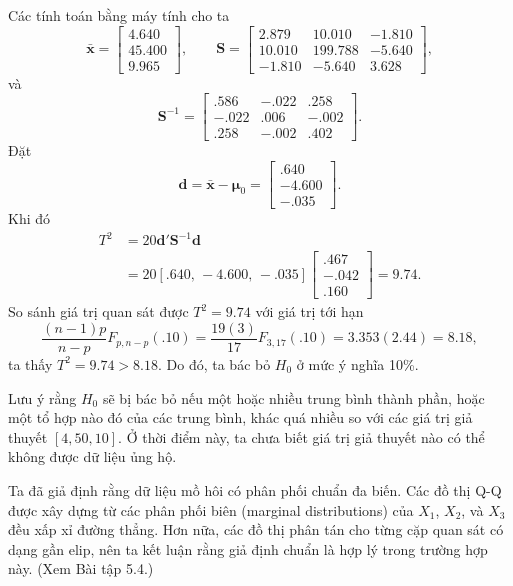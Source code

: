 Các tính toán bằng máy tính cho ta
\[
  \bar{\mathbf{x}} =
  \begin{bmatrix}
    4.640 \\
    45.400 \\
    9.965
  \end{bmatrix},
  \qquad
  \mathbf{S}=
  \begin{bmatrix}
    2.879 & 10.010 & -1.810 \\
    10.010 & 199.788 & -5.640 \\
    -1.810 & -5.640 & 3.628
  \end{bmatrix},
\]
và
\[
  \mathbf{S}^{-1}=
  \begin{bmatrix}
    .586 & -.022 & .258 \\
    -.022 & .006 & -.002 \\
    .258 & -.002 & .402
  \end{bmatrix}.
\]
Đặt
\[
  \mathbf{d}
  = \bar{\mathbf{x}}-\boldsymbol{\mu}_0
  = \begin{bmatrix} .640 \\ -4.600 \\ -.035 \end{bmatrix}.
\]
Khi đó
\[
\begin{aligned}
  T^2
  &= 20\mathbf{d}'\mathbf{S}^{-1}\mathbf{d} \\
  &= 20[.640,\,-4.600,\,-.035]
  \begin{bmatrix}
    .467 \\
    -.042 \\
    .160
  \end{bmatrix}
  = 9.74.
\end{aligned}
\]
So sánh giá trị quan sát được \(T^2=9.74\) với giá trị tới hạn
\[
  \frac{(n-1)p}{n-p}F_{p,n-p}(.10)
  = \frac{19(3)}{17}F_{3,17}(.10)
  = 3.353(2.44)
  = 8.18,
\]
ta thấy \(T^2=9.74>8.18\). Do đó, ta bác bỏ \(H_0\) ở mức ý nghĩa 10\%.

Lưu ý rằng \(H_0\) sẽ bị bác bỏ nếu một hoặc nhiều trung bình thành phần, hoặc một
tổ hợp nào đó của các trung bình, khác quá nhiều so với các giá trị giả thuyết
\([4,50,10]\). Ở thời điểm này, ta chưa biết giá trị giả thuyết nào có thể không
được dữ liệu ủng hộ.

Ta đã giả định rằng dữ liệu mồ hôi có phân phối chuẩn đa biến. Các đồ thị Q-Q
được xây dựng từ các phân phối biên (marginal distributions) của \(X_1\), \(X_2\),
và \(X_3\) đều xấp xỉ đường thẳng. Hơn nữa, các đồ thị phân tán cho từng cặp quan
sát có dạng gần elip, nên ta kết luận rằng giả định chuẩn là hợp lý trong trường hợp
này. (Xem Bài tập 5.4.)

